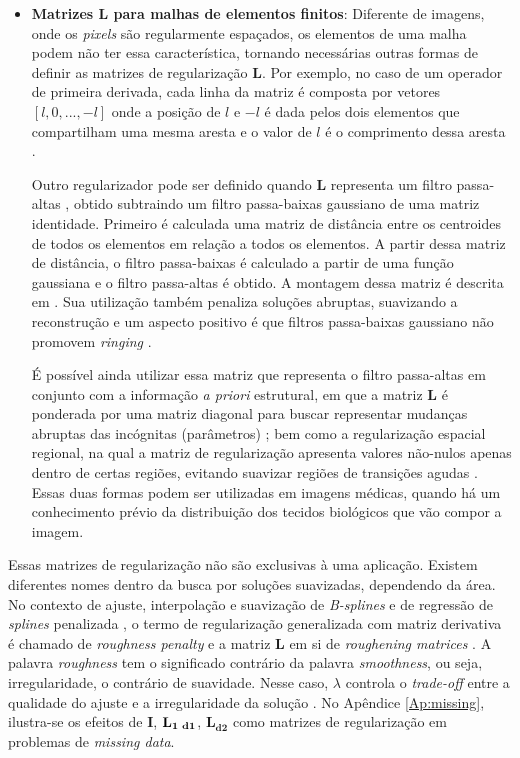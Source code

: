 \begin{itemize}
\item \textbf{Matrizes $\mathbf{L}$ para malhas de elementos finitos}: Diferente de imagens, onde os \textit{pixels} são regularmente espaçados, os elementos de uma malha podem não ter essa característica, tornando necessárias outras formas de definir as matrizes de regularização  $\mathbf{L}$. Por exemplo, no caso de um operador de primeira derivada, cada linha da matriz é composta por vetores $[l , 0, ..., -l ]$ onde a posição de $l$ e $-l$ é dada pelos dois elementos que compartilham uma mesma aresta e o valor de $l$ é o comprimento dessa aresta \cite[pág. 3]{Borsic2010}. 
 
 Outro regularizador pode ser definido quando $\mathbf{L}$ representa um filtro passa-altas \cite{Adler1996}, obtido subtraindo um filtro passa-baixas gaussiano de uma matriz identidade. Primeiro é calculada uma matriz de distância entre os centroides de todos os elementos em relação a todos os elementos. A partir dessa matriz de distância, o filtro passa-baixas é calculado a partir de uma função gaussiana e o filtro passa-altas é obtido. A montagem dessa matriz é descrita em \cite[págs. 115-6]{2013moura}. Sua utilização também penaliza soluções abruptas, suavizando a reconstrução e um aspecto positivo é que filtros passa-baixas gaussiano não promovem \textit{ringing} \cite[pág. 277]{gonzalez2018}. 
 
É possível ainda utilizar essa matriz que representa o filtro passa-altas em conjunto  com a informação \textit{a priori} estrutural, em que a matriz $\mathbf{L}$ é ponderada por uma matriz diagonal para buscar representar mudanças abruptas das incógnitas (parâmetros) \cite[pág. 6]{Calvetti2018a}; bem como a regularização espacial regional, na qual a matriz de regularização apresenta valores não-nulos apenas dentro de certas regiões, evitando suavizar regiões de transições agudas \cite[pág. 167]{Horesh}. Essas duas formas podem ser utilizadas em imagens médicas, quando há um conhecimento prévio da distribuição dos tecidos biológicos que vão compor a imagem. 
\end{itemize}

Essas matrizes de regularização não são exclusivas à uma aplicação.  Existem diferentes nomes dentro da busca por soluções suavizadas, dependendo da área. No contexto de ajuste, interpolação e suavização de \textit{B-splines} \cite{Eilers1996, Ramsay1997} e de regressão de \textit{splines} penalizada \cite[Seção 3.5]{ruppert2003semiparametric}, o termo de regularização generalizada com matriz derivativa é chamado de \textit{roughness penalty} e a matriz $\mathbf{L}$ em si de \textit{roughening matrices} \cite[pág. 103]{aster2019parameter}. A palavra \textit{roughness} tem o significado contrário da palavra  \textit{smoothness}, ou seja, irregularidade, o contrário de suavidade. Nesse caso,  $\lambda$ controla o \textit{trade-off} entre  a qualidade do ajuste e a irregularidade da solução \cite[pág. 2797]{Chen2002}. No Apêndice \ref{Ap:missing}, ilustra-se os efeitos de $\mathbf{I}$, $\mathbf{L_{1 \hspace{1mm} d1}}$, $\mathbf{L_{d2}}$ como matrizes de regularização em problemas de \textit{missing data}. 


